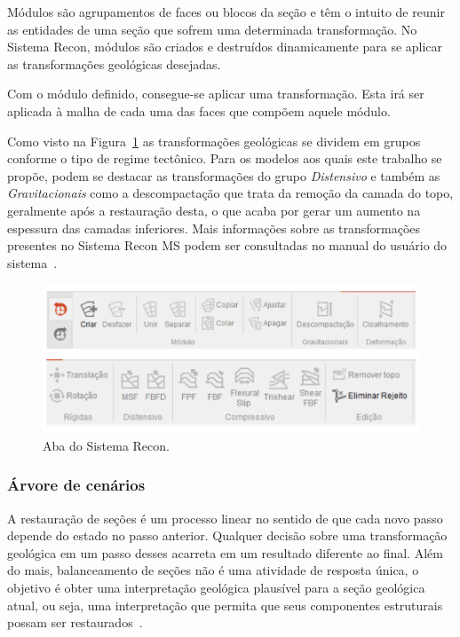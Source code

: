 Módulos são agrupamentos de faces ou blocos da seção e têm o intuito de reunir as entidades de uma seção que sofrem uma determinada transformação. No Sistema Recon, módulos são criados e destruídos dinamicamente para se aplicar as transformações geológicas desejadas.

Com o módulo definido, consegue-se aplicar uma transformação. Esta irá ser aplicada à malha de cada uma das faces que compõem aquele módulo.

Como visto na Figura~\ref{fig-recon-5} as transformações geológicas se dividem em grupos conforme o tipo de regime tectônico. Para os modelos aos quais este trabalho se propõe, podem se destacar as transformações do grupo \emph{Distensivo} e também as \emph{Gravitacionais} como a descompactação que trata da remoção da camada do topo, geralmente após a restauração desta, o que acaba por gerar um aumento na espessura das camadas inferiores. Mais informações sobre as transformações presentes no Sistema Recon MS podem ser consultadas no manual do usuário do sistema~\cite{Recon}.

\begin{figure} [H]
  \begin{center}
    \includegraphics[width=\textwidth]{images/fig-recon-5}
    \caption{Aba  do Sistema Recon.}\label{fig-recon-5}
  \end{center}
\end{figure}

\subsubsection{Árvore de cenários}

A restauração de seções é um processo linear no sentido de que cada novo passo depende do estado no passo anterior. Qualquer decisão sobre uma transformação geológica em um passo desses acarreta em um resultado diferente ao final. Além do mais, balanceamento de seções não é uma atividade de resposta única, o objetivo é obter uma interpretação geológica plausível para a seção geológica atual, ou seja, uma interpretação que permita que seus componentes estruturais possam ser restaurados~\cite{Fossen}. 

